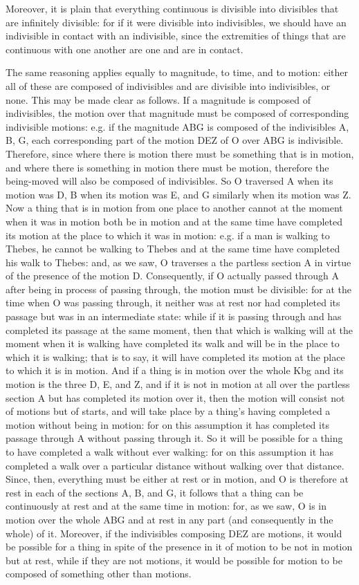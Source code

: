 Moreover, it is plain that everything continuous is divisible into
divisibles that are infinitely divisible: for if it were divisible
into indivisibles, we should have an indivisible in contact with an
indivisible, since the extremities of things that are continuous with
one another are one and are in contact. 

The same reasoning applies equally to magnitude, to time, and to motion:
either all of these are composed of indivisibles and are divisible
into indivisibles, or none. This may be made clear as follows. If
a magnitude is composed of indivisibles, the motion over that magnitude
must be composed of corresponding indivisible motions: e.g. if the
magnitude ABG is composed of the indivisibles A, B, G, each corresponding
part of the motion DEZ of O over ABG is indivisible. Therefore, since
where there is motion there must be something that is in motion, and
where there is something in motion there must be motion, therefore
the being-moved will also be composed of indivisibles. So O traversed
A when its motion was D, B when its motion was E, and G similarly
when its motion was Z. Now a thing that is in motion from one place
to another cannot at the moment when it was in motion both be in motion
and at the same time have completed its motion at the place to which
it was in motion: e.g. if a man is walking to Thebes, he cannot be
walking to Thebes and at the same time have completed his walk to
Thebes: and, as we saw, O traverses a the partless section A in virtue
of the presence of the motion D. Consequently, if O actually passed
through A after being in process of passing through, the motion must
be divisible: for at the time when O was passing through, it neither
was at rest nor had completed its passage but was in an intermediate
state: while if it is passing through and has completed its passage
at the same moment, then that which is walking will at the moment
when it is walking have completed its walk and will be in the place
to which it is walking; that is to say, it will have completed its
motion at the place to which it is in motion. And if a thing is in
motion over the whole Kbg and its motion is the three D, E, and Z,
and if it is not in motion at all over the partless section A but
has completed its motion over it, then the motion will consist not
of motions but of starts, and will take place by a thing's having
completed a motion without being in motion: for on this assumption
it has completed its passage through A without passing through it.
So it will be possible for a thing to have completed a walk without
ever walking: for on this assumption it has completed a walk over
a particular distance without walking over that distance. Since, then,
everything must be either at rest or in motion, and O is therefore
at rest in each of the sections A, B, and G, it follows that a thing
can be continuously at rest and at the same time in motion: for, as
we saw, O is in motion over the whole ABG and at rest in any part
(and consequently in the whole) of it. Moreover, if the indivisibles
composing DEZ are motions, it would be possible for a thing in spite
of the presence in it of motion to be not in motion but at rest, while
if they are not motions, it would be possible for motion to be composed
of something other than motions. 

